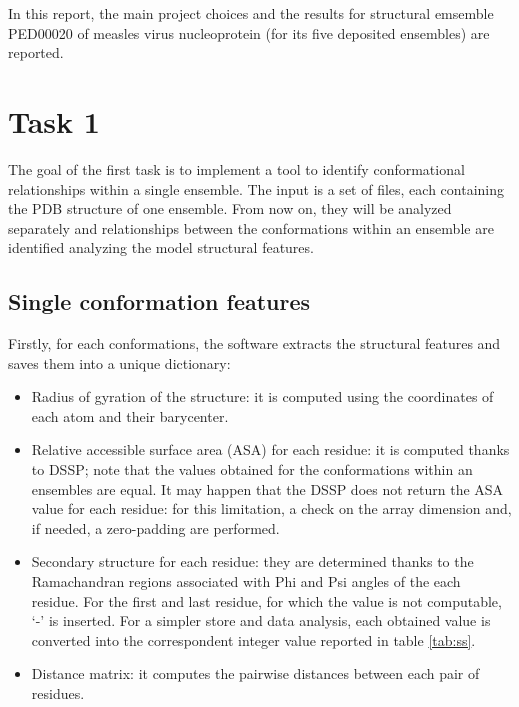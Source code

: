 In this report, the main project choices and the results for structural emsemble PED00020 of measles virus nucleoprotein (for its five deposited ensembles) are reported.

\section{Task 1}\label{sec:task1}
\graphicspath{ {./figures/} }

The goal of the first task is to implement a tool to identify conformational relationships within a single ensemble. The input is a set of files, each containing the PDB structure of one ensemble. From now on, they will be analyzed separately and relationships between the conformations within an ensemble are identified analyzing the model structural features. 


\subsection{Single conformation features}

Firstly, for each conformations, the software extracts the structural features and saves them into a unique dictionary:
\begin{itemize}
\item Radius of gyration of the structure: it is computed using the coordinates of each atom and their barycenter.
\item Relative accessible surface area (ASA) for each residue: it is computed thanks to DSSP; note that the values obtained for the conformations within an ensembles are equal. It may happen that the DSSP does not return the ASA value for each residue: for this limitation, a check on the array dimension and, if needed, a zero-padding are performed. 
\item Secondary structure for each residue: they are determined thanks to the Ramachandran regions associated with Phi and Psi angles of the each residue. For the first and last residue, for which the value is not computable, `-' is inserted. For a simpler store and data analysis, each obtained value is converted into the correspondent integer value reported in table \ref{tab:ss}. 
\item Distance matrix: it computes the pairwise distances between each pair of residues.%
\end{itemize}

